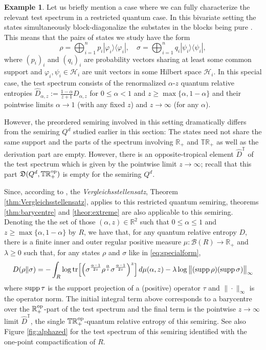 \documentclass[12pt,a4paper,reqno]{amsart}
\theoremstyle{definition}
\newtheorem{example}[proposition]{Example}
\newcommand{\mc}[1]{\mathcal{#1}}
\newcommand{\mf}[1]{\mathfrak{#1}}
\newcommand{\R}{\mathbb R}
\newcommand{\T}{\mathbb T}
\newcommand{\hil}{\mathcal{H}}
\newcommand{\tr}[1]{\mathrm{tr}\left[#1\right]} %
\def\<{\langle}
\def\>{\rangle}
\newcommand{\fii}{\varphi}
\let\originalleft\left
\let\originalright\right
\renewcommand{\left}{\mathopen{}\mathclose\bgroup\originalleft}
\renewcommand{\right}{\aftergroup\egroup\originalright}
\begin{document}
\begin{example}
Let us briefly mention a case where we can fully characterize the relevant test spectrum in a restricted quantum case.
In this bivariate setting the states simultaneously block-diagonalize the substates in the blocks being pure \cite{Verhagen_et_al_2025}. This means that the pairs of states we study have the form
\begin{equation}\label{eq:specialform}
\rho=\bigoplus_{i=1}^n p_i|\fii_i\>\<\fii_i|,\quad\sigma=\bigoplus_{i=1}^n q_i|\psi_i\>\<\psi_i|,
\end{equation}
where $(p_i)_i$ and $(q_i)_i$ are probability vectors sharing at least some common support and $\fii_i,\psi_i\in\hil_i$ are unit vectors in some Hilbert space $\hil_i$. In this special case, the test spectrum consists of the renormalized $\alpha$-$z$ quantum relative entropies $\hat{D}_{\alpha,z}:=\frac{1-\alpha}{z+1}D_{\alpha,z}$ for $0\leq\alpha<1$ and $z\geq\max\{\alpha,1-\alpha\}$ and their pointwise limits $\alpha\to 1$ (with any fixed $z$) and $z\to\infty$ (for any $\alpha$).

However, the preordered semiring involved in this setting dramatically differs from the semiring $Q^d$ studied earlier in this section: The states need not share the same support and the parts of the spectrum involving $\R_+$ and $\T\R_+$ as well as the derivation part are empty. However, there is an opposite-tropical element $\hat{D}^\T$ of the test spectrum which is given by the pointwise limit $z\to\infty$; recall that this part $\mf D(Q^d,\T\R_+^{\rm op})$ is empty for the semiring $Q^d$.

Since, according to \cite{Verhagen_et_al_2025}, the {\it Vergleichsstellensatz}, Theorem \ref{thm:Vergleichsstellensatz}, applies to this restricted quantum semiring, theorems \ref{thm:barycentre} and \ref{theor:extreme} are also applicable to this semiring. Denoting the the set of those $(\alpha,z)\in\R^2$ such that $0\leq\alpha\leq 1$ and $z\geq\max\{\alpha,1-\alpha\}$ by $R$, we have that, for any quantum relative entropy $D$, there is a finite inner and outer regular positive measure $\mu:\mc B(R)\to\R_+$ and $\lambda\geq0$ such that, for any states $\rho$ and $\sigma$ like in \eqref{eq:specialform},
$$
D(\rho\|\sigma)=-\int_R \log{\tr{\left(\sigma^{\frac{\alpha-1}{2z}}\rho^{\frac{\alpha}{z}}\sigma^{\frac{\alpha-1}{2z}}\right)^z}}\,d\mu(\alpha,z)-\lambda\log{\big\|({\rm supp}\,\rho)({\rm supp}\,\sigma)\big\|_\infty}
$$
where ${\rm supp}\,\tau$ is the support projection of a (positive) operator $\tau$ and $\|\cdot\|_\infty$ is the operator norm. The initial integral term above corresponds to a barycentre over the $\R_+^{\rm op}$-part of the test spectrum and the final term is the pointwise $z\to\infty$ limit $\hat{D}^\T$, the single $\T\R_+^{\rm op}$-quantum relative entropy of this semiring. See also Figure \ref{fig:alphazed} for the test spectrum of this semiring identified with the one-point compactification of $R$.
\end{example}
\end{document}
